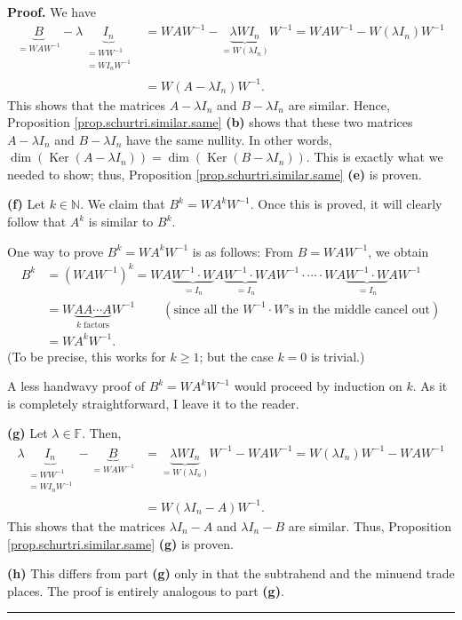 \documentclass[numbers=enddot,12pt,final,onecolumn,notitlepage]{scrartcl}%
\numberwithin{exer}{subsection}
\theoremstyle{definition}
\newenvironment{proof}[1][Proof]{\noindent\textbf{#1.} }{\ \rule{0.5em}{0.5em}}
\begin{document}
\begin{proof}
We have%
\begin{align*}
\underbrace{B}_{=WAW^{-1}}-\lambda\underbrace{I_{n}}_{\substack{=WW^{-1}%
\\=WI_{n}W^{-1}}}  &  =WAW^{-1}-\underbrace{\lambda WI_{n}}_{=W\left(  \lambda
I_{n}\right)  }W^{-1}=WAW^{-1}-W\left(  \lambda I_{n}\right)  W^{-1}\\
&  =W\left(  A-\lambda I_{n}\right)  W^{-1}.
\end{align*}
This shows that the matrices $A-\lambda I_{n}$ and $B-\lambda I_{n}$ are
similar. Hence, Proposition \ref{prop.schurtri.similar.same} \textbf{(b)}
shows that these two matrices $A-\lambda I_{n}$ and $B-\lambda I_{n}$ have the
same nullity. In other words, $\dim\left(  \operatorname*{Ker}\left(
A-\lambda I_{n}\right)  \right)  =\dim\left(  \operatorname*{Ker}\left(
B-\lambda I_{n}\right)  \right)  $. This is exactly what we needed to show;
thus, Proposition \ref{prop.schurtri.similar.same} \textbf{(e)} is proven.
\medskip

\textbf{(f)} Let $k\in\mathbb{N}$. We claim that $B^{k}=WA^{k}W^{-1}$. Once
this is proved, it will clearly follow that $A^{k}$ is similar to $B^{k}$.

One way to prove $B^{k}=WA^{k}W^{-1}$ is as follows: From $B=WAW^{-1}$, we
obtain%
\begin{align*}
B^{k}  &  =\left(  WAW^{-1}\right)  ^{k}=WA\underbrace{W^{-1}\cdot W}_{=I_{n}%
}A\underbrace{W^{-1}\cdot W}_{=I_{n}}AW^{-1}\cdot\cdots\cdot
WA\underbrace{W^{-1}\cdot W}_{=I_{n}}AW^{-1}\\
&  =W\underbrace{AA\cdots A}_{k\text{ factors}}W^{-1}%
\ \ \ \ \ \ \ \ \ \ \left(  \text{since all the }W^{-1}\cdot W\text{'s in the
middle cancel out}\right) \\
&  =WA^{k}W^{-1}.
\end{align*}
(To be precise, this works for $k\geq1$; but the case $k=0$ is trivial.)

A less handwavy proof of $B^{k}=WA^{k}W^{-1}$ would proceed by induction on
$k$. As it is completely straightforward, I leave it to the reader. \medskip

\textbf{(g)} Let $\lambda\in\mathbb{F}$. Then,
\begin{align*}
\lambda\underbrace{I_{n}}_{\substack{=WW^{-1}\\=WI_{n}W^{-1}}}-\underbrace{B}%
_{=WAW^{-1}}  &  =\underbrace{\lambda WI_{n}}_{=W\left(  \lambda I_{n}\right)
}W^{-1}-WAW^{-1}=W\left(  \lambda I_{n}\right)  W^{-1}-WAW^{-1}\\
&  =W\left(  \lambda I_{n}-A\right)  W^{-1}.
\end{align*}
This shows that the matrices $\lambda I_{n}-A$ and $\lambda I_{n}-B$ are
similar. Thus, Proposition \ref{prop.schurtri.similar.same} \textbf{(g)} is
proven.\medskip

\textbf{(h)} This differs from part \textbf{(g)} only in that the subtrahend
and the minuend trade places. The proof is entirely analogous to part
\textbf{(g)}.
\end{proof}
\end{document}
